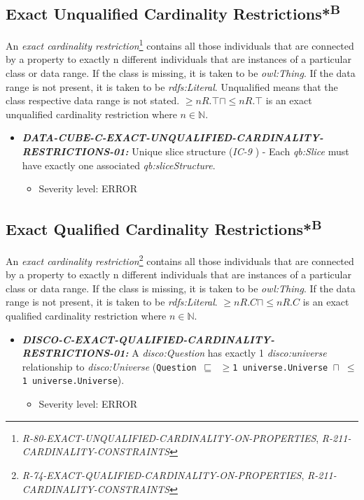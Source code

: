 \documentclass{llncs}
\newcommand{\ms}[1]{\texttt{#1}}
\begin{document}
\subsection{Exact Unqualified Cardinality Restrictions*\textsuperscript{B}}

An \emph{exact cardinality restriction}\footnote{{\em R-80-EXACT-UNQUALIFIED-CARDINALITY-ON-PROPERTIES}, {\em R-211-CARDINALITY-CONSTRAINTS}} contains all those individuals that are connected by a property to exactly n different individuals that are instances of a particular class or data range. 
If the class is missing, it is taken to be \emph{owl:Thing}. 
If the data range is not present, it is taken to be \emph{rdfs:Literal}.
Unqualified means that the class respective data range is not stated. 
$\geq n R. \top \sqcap \leq n R. \top $ is an exact unqualified cardinality restriction where $n \in \mathbb{N}$.

\begin{itemize}
	\item \textbf{{\em DATA-CUBE-C-EXACT-UNQUALIFIED-CARDINALITY-RESTRICTIONS-01:}}
	Unique slice structure (\emph{IC-9} \cite{CyganiakReynolds2014}) -  
	Each \emph{qb:Slice} must have exactly one associated \emph{qb:sliceStructure}. 
	\begin{itemize}
		\item Severity level: ERROR
	\end{itemize}
\end{itemize}

\subsection{Exact Qualified Cardinality Restrictions*\textsuperscript{B}}

An \emph{exact cardinality restriction}\footnote{{\em R-74-EXACT-QUALIFIED-CARDINALITY-ON-PROPERTIES}, {\em R-211-CARDINALITY-CONSTRAINTS}} contains all those individuals that are connected by a property to exactly n different individuals that are instances of a particular class or data range. 
If the class is missing, it is taken to be \emph{owl:Thing}. 
If the data range is not present, it is taken to be \emph{rdfs:Literal}.
$\geq n R. C \sqcap \leq n R. C $ is an exact qualified cardinality restriction where $n \in \mathbb{N}$.

\begin{itemize}
	\item \textbf{{\em DISCO-C-EXACT-QUALIFIED-CARDINALITY-RESTRICTIONS-01:}}
A {\em disco:Question} has exactly 1 {\em disco:universe} relationship to {\em disco:Universe} (\ms{Question $\sqsubseteq$ $\geq$1 universe.Universe $\sqcap$ $\leq$1 universe.Universe}).
  \begin{itemize}
		\item Severity level: ERROR
	\end{itemize}
\end{itemize}
\end{document}
